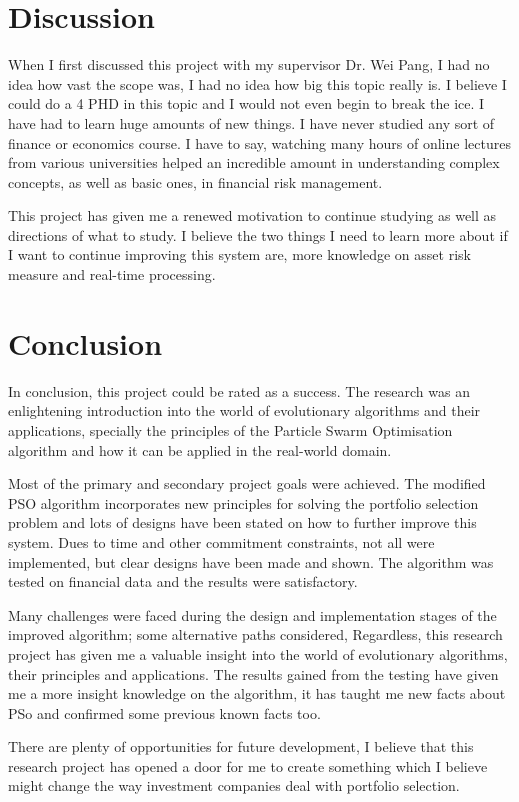   \section{Discussion} %
  \label{sec:discussion}
  When I first discussed this project with my supervisor Dr. Wei Pang, I had no idea how vast the scope was, I had no idea how big this topic really is. I believe I could do a 4 PHD in this topic and I would not even begin to break the ice. I have had to learn huge amounts of new things. I have never studied any sort of finance or economics course. I have to say, watching many hours of online lectures from various universities helped an incredible amount in understanding complex concepts, as well as basic ones, in financial risk management.

  This project has given me a renewed motivation to continue studying as well as directions of what to study. I believe the two things I need to learn more about if I want to continue improving this system are, more knowledge on asset risk measure and real-time processing. 

  \section{Conclusion} %
  \label{sec:conclusion}
  In conclusion, this project could be rated as a success. The research was an enlightening introduction into the world of evolutionary algorithms and their applications, specially the principles of the Particle Swarm Optimisation algorithm and how it can be applied in the real-world domain.

  Most of the primary and secondary project goals were achieved. The modified PSO algorithm incorporates new principles for solving the portfolio selection problem and lots of designs have been stated on how to further improve this system. Dues to time and other commitment constraints, not all were implemented, but clear designs have been made and shown. The algorithm was tested on financial data and the results were satisfactory.

  Many challenges were faced during the design and implementation stages of the improved algorithm; some alternative paths considered, Regardless, this research project has given me a valuable insight into the world of evolutionary algorithms, their principles and applications. The results gained from the testing have given me a more insight knowledge on the algorithm, it has taught me new facts about PSo and confirmed some previous known facts too.

  There are plenty of opportunities for future development, I believe that this research project has opened a door for me to create something which I believe might change the way investment companies deal with portfolio selection.
  

